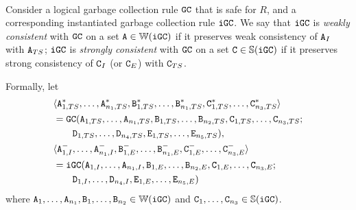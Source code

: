 \begin{property}\label{property:instantiated_gc_consistent}~

Consider a logical garbage collection rule $\tt{GC}$ that is safe for $R$, and a corresponding instantiated garbage collection rule $\tt{iGC}$.
We say that
$\tt{iGC}$ is \emph{weakly consistent}   with $\tt{GC}$ on a set $\tt{A} \in \mathbb{W}(\tt{iGC})$ if it preserves weak consistency   of $\tt{A}_I$                 with $\tt{A}_{TS}$;
$\tt{iGC}$ is \emph{strongly consistent} with $\tt{GC}$ on a set $\tt{C} \in \mathbb{S}(\tt{iGC})$ if it preserves strong consistency of $\tt{C}_I$ (or $\tt{C}_E$) with $\tt{C}_{TS}$.

Formally, let
\begin{align*}
&\langle
\tt{A}_{1,TS}^*, \dots, \tt{A}_{n_1,TS}^*,
\tt{B}_{1,TS}^*, \dots, \tt{B}_{n_1,TS}^*, 
\tt{C}_{1,TS}^*, \dots, \tt{C}_{n_3,TS}^*
\rangle \\
&= \tt{GC}(
\tt{A}_{1,TS}, \dots, \tt{A}_{n_1,TS},
\tt{B}_{1,TS}, \dots, \tt{B}_{n_2,TS},
\tt{C}_{1,TS}, \dots, \tt{C}_{n_3,TS};
\\&\qquad
\tt{D}_{1,TS}, \dots, \tt{D}_{n_4,TS},
\tt{E}_{1,TS}, \dots, \tt{E}_{n_5,TS}
),\\
&\langle
\tt{A}_{1,I}^-, \dots, \tt{A}_{n_1,I}^-,
\tt{B}_{1,E}^-, \dots, \tt{B}_{n_1,E}^-,
\tt{C}_{1,E}^-, \dots, \tt{C}_{n_3,E}^-
\rangle\\
&= \tt{iGC}(
\tt{A}_{1,I}, \dots, \tt{A}_{n_1,I},
\tt{B}_{1,E}, \dots, \tt{B}_{n_2,E},
\tt{C}_{1,E}, \dots, \tt{C}_{n_3,E};
\\&\qquad
\tt{D}_{1,I}, \dots, \tt{D}_{n_4,I},
\tt{E}_{1,E}, \dots, \tt{E}_{n_5,E}
)
\end{align*}
where $\tt{A}_1, \dots, \tt{A}_{n_1}, \tt{B}_1, \dots, \tt{B}_{n_2} \in \mathbb{W}(\tt{iGC})$ and $\tt{C}_1, \dots, \tt{C}_{n_3} \in \mathbb{S}(\tt{iGC})$.


\end{property}
